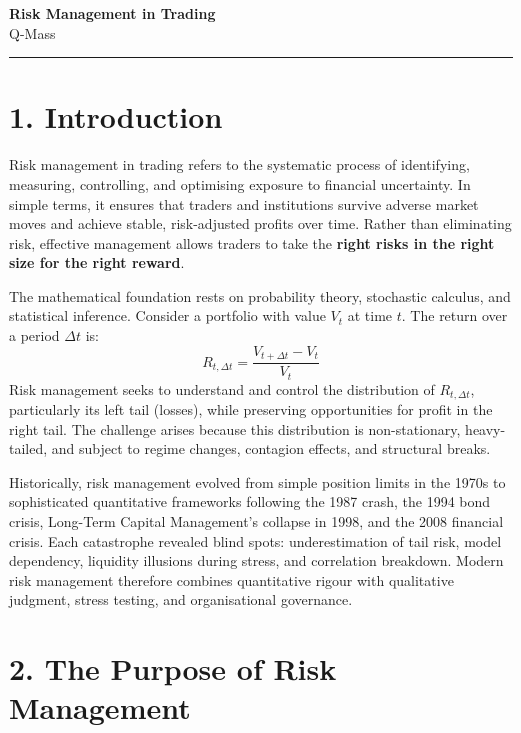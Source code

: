 \documentclass[11pt,a4paper]{article}
\begin{document}
\begin{center}
    {\LARGE \textbf{Risk Management in Trading}}\\[6pt]
    {\large Q-Mass}\\[4pt]
    \rule{0.9\linewidth}{0.5pt}
\end{center}

\section*{1. Introduction}

Risk management in trading refers to the systematic process of identifying, measuring, controlling, and optimising exposure to financial uncertainty. In simple terms, it ensures that traders and institutions survive adverse market moves and achieve stable, risk-adjusted profits over time. Rather than eliminating risk, effective management allows traders to take the \textbf{right risks in the right size for the right reward}.

The mathematical foundation rests on probability theory, stochastic calculus, and statistical inference. Consider a portfolio with value $V_t$ at time $t$. The return over a period $\Delta t$ is:
\[
R_{t,\Delta t} = \frac{V_{t+\Delta t} - V_t}{V_t}
\]
Risk management seeks to understand and control the distribution of $R_{t,\Delta t}$, particularly its left tail (losses), while preserving opportunities for profit in the right tail. The challenge arises because this distribution is non-stationary, heavy-tailed, and subject to regime changes, contagion effects, and structural breaks.

Historically, risk management evolved from simple position limits in the 1970s to sophisticated quantitative frameworks following the 1987 crash, the 1994 bond crisis, Long-Term Capital Management's collapse in 1998, and the 2008 financial crisis. Each catastrophe revealed blind spots: underestimation of tail risk, model dependency, liquidity illusions during stress, and correlation breakdown. Modern risk management therefore combines quantitative rigour with qualitative judgment, stress testing, and organisational governance.

\section*{2. The Purpose of Risk Management}
\end{document}
